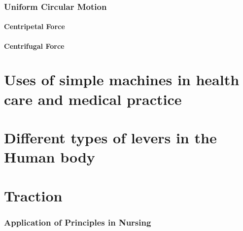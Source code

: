 \documentclass[12pt]{book}
\begin{document}
\subsection{Uniform Circular Motion}
\subsubsection{Centripetal Force}
\subsubsection{Centrifugal Force}
\chapter{Uses of simple machines in health care and medical practice}
\chapter{Different types of levers in the Human body}
\chapter{Traction}
\subsection{Application of Principles in Nursing}
\end{document}
